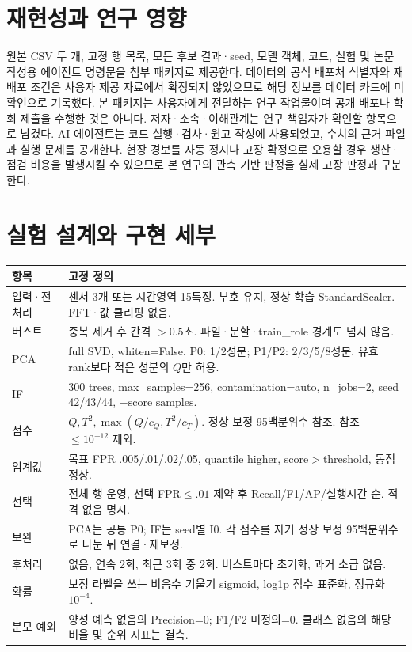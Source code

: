 \documentclass{article}
\begin{document}
\section*{재현성과 연구 영향}
원본 CSV 두 개, 고정 행 목록, 모든 후보 결과·seed, 모델 객체, 코드, 실험 및 논문 작성용 에이전트 명령문을 첨부 패키지로 제공한다. 데이터의 공식 배포처 식별자와 재배포 조건은 사용자 제공 자료에서 확정되지 않았으므로 해당 정보를 데이터 카드에 미확인으로 기록했다. 본 패키지는 사용자에게 전달하는 연구 작업물이며 공개 배포나 학회 제출을 수행한 것은 아니다. 저자·소속·이해관계는 연구 책임자가 확인할 항목으로 남겼다. AI 에이전트는 코드 실행·검사·원고 작성에 사용되었고, 수치의 근거 파일과 실행 문제를 공개한다. 현장 경보를 자동 정지나 고장 확정으로 오용할 경우 생산·점검 비용을 발생시킬 수 있으므로 본 연구의 관측 기반 판정을 실제 고장 판정과 구분한다.



\clearpage
\appendix
\onecolumn
\section{실험 설계와 구현 세부}
\begin{table}[h]\centering\small
\begin{tabularx}{\textwidth}{lX}\toprule
항목 & 고정 정의\\\midrule
입력·전처리 & 센서 3개 또는 시간영역 15특징. 부호 유지, 정상 학습 StandardScaler. FFT·값 클리핑 없음.\\
버스트 & 중복 제거 후 간격 $>0.5$초. 파일·분할·train\_role 경계도 넘지 않음.\\
PCA & full SVD, whiten=False. P0: 1/2성분; P1/P2: 2/3/5/8성분. 유효 rank보다 적은 성분의 $Q$만 허용.\\
IF & 300 trees, max\_samples=256, contamination=auto, n\_jobs=2, seed 42/43/44, $-\mathrm{score\_samples}$.\\
점수 & $Q,T^2,\max(Q/c_Q,T^2/c_T)$. 정상 보정 95백분위수 참조. 참조 $\leq10^{-12}$ 제외.\\
임계값 & 목표 FPR .005/.01/.02/.05, quantile higher, score$>$threshold, 동점 정상.\\
선택 & 전체 행 운영, 선택 FPR$\leq.01$ 제약 후 Recall/F1/AP/실행시간 순. 적격 없음 명시.\\
보완 & PCA는 공통 P0; IF는 seed별 I0. 각 점수를 자기 정상 보정 95백분위수로 나눈 뒤 연결·재보정.\\
후처리 & 없음, 연속 2회, 최근 3회 중 2회. 버스트마다 초기화, 과거 소급 없음.\\
확률 & 보정 라벨을 쓰는 비음수 기울기 sigmoid, log1p 점수 표준화, 정규화 $10^{-4}$.\\
분모 예외 & 양성 예측 없음의 Precision=0; F1/F2 미정의=0. 클래스 없음의 해당 비율 및 순위 지표는 결측.\\\bottomrule
\end{tabularx}
\end{table}
\end{document}
